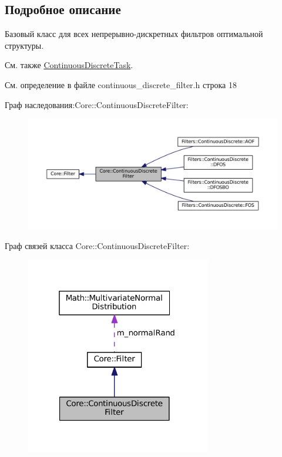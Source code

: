 \subsection{Подробное описание}
Базовый класс для всех непрерывно-\/дискретных фильтров оптимальной структуры. 

\begin{DoxySeeAlso}{См. также}
\hyperlink{class_core_1_1_continuous_discrete_task}{Continuous\+Discrete\+Task}. 
\end{DoxySeeAlso}


См. определение в файле continuous\+\_\+discrete\+\_\+filter.\+h строка 18



Граф наследования\+:Core\+:\+:Continuous\+Discrete\+Filter\+:
\nopagebreak
\begin{figure}[H]
\begin{center}
\leavevmode
\includegraphics[width=350pt]{class_core_1_1_continuous_discrete_filter__inherit__graph}
\end{center}
\end{figure}


Граф связей класса Core\+:\+:Continuous\+Discrete\+Filter\+:
\nopagebreak
\begin{figure}[H]
\begin{center}
\leavevmode
\includegraphics[width=229pt]{class_core_1_1_continuous_discrete_filter__coll__graph}
\end{center}
\end{figure}


